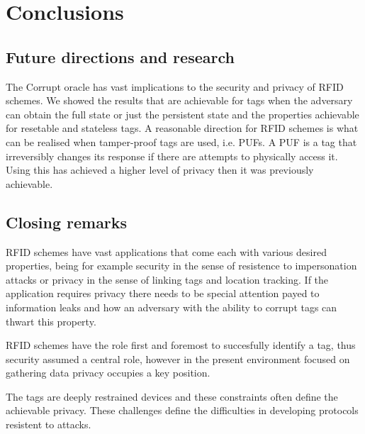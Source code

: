 \chapter*{Conclusions} 

\section*{Future directions and research}
The Corrupt oracle has vast implications to the security and privacy of RFID schemes. We showed the results that are achievable for tags
when the adversary can obtain the full state or just the persistent state and the properties achievable for resetable and stateless tags.
A reasonable direction for RFID schemes is what can be realised when tamper-proof tags are used, i.e. PUFs. A PUF is a tag that irreversibly changes 
its response if there are attempts to physically access it. Using this \cite{PUFs} has achieved a higher level of privacy then it was 
previously achievable.

\section*{Closing remarks}
RFID schemes have vast applications that come each with various desired properties, being for example security in the sense of resistence to impersonation attacks 
or privacy in the sense of linking tags and location tracking. If the application requires privacy there needs to be special attention payed to information leaks
and how an adversary with the ability to corrupt tags can thwart this property.

RFID schemes have the role first and foremost to succesfully identify a tag, thus security assumed a central role, however in the present environment focused on 
gathering data privacy occupies a key position.

The tags are deeply restrained devices and these constraints often define the achievable privacy. These challenges define the difficulties in developing protocols
resistent to attacks.